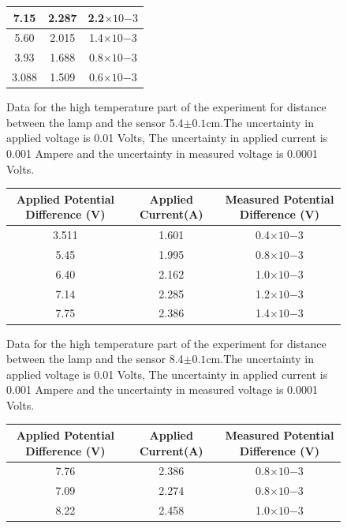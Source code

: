 \documentclass[10pt,a4paper]{article}
\begin{document}
{\begin{center}
\begin{figure} [H]
\begin{tabular}{|c |c|c|}
			\hline
			7.15 & 2.287 & 2.2$\times10{-3}$\\
			\hline
			5.60 & 2.015 & 1.4$\times10{-3}$\\
			\hline
			3.93 & 1.688 & 0.8$\times10{-3}$\\
			\hline
			3.088 & 1.509 & 0.6$\times10{-3}$\\
			\hline
		\end{tabular}
		\caption{Data for the high temperature part of the experiment for distance between the lamp and the sensor 5.4$\pm0.1$cm.The uncertainty in applied voltage is 0.01 Volts, The uncertainty in applied current is 0.001 Ampere and the uncertainty in measured voltage is 0.0001 Volts.}
	\end{figure}
\end{center}
\begin{center}
	\begin{figure} [H] 
		\begin{tabular}{|c |c|c|} \hline
			Applied Potential Difference (V)& Applied Current(A) & Measured Potential Difference (V)\\ [0.5ex] 
			\hline
			3.511 & 1.601 & 0.4$\times10{-3}$\\
			\hline
			5.45 & 1.995 & 0.8$\times10{-3}$\\
			\hline
			6.40 & 2.162 & 1.0$\times10{-3}$\\
			\hline
			7.14 & 2.285 & 1.2$\times10{-3}$\\
			\hline
			7.75 & 2.386 & 1.4$\times10{-3}$\\
			\hline
		\end{tabular}
		\caption{Data for the high temperature part of the experiment for distance between the lamp and the sensor 8.4$\pm0.1$cm.The uncertainty in applied voltage is 0.01 Volts, The uncertainty in applied current is 0.001 Ampere and the uncertainty in measured voltage is 0.0001 Volts.}
	\end{figure}
\end{center}
\begin{center}
	\begin{figure} [H] 
		\begin{tabular}{|c |c|c|} \hline
			Applied Potential Difference (V)& Applied Current(A) & Measured Potential Difference (V)\\ [0.5ex] 
			\hline
			7.76 & 2.386 & 0.8$\times10{-3}$\\
			\hline
			7.09 & 2.274 & 0.8$\times10{-3}$\\
			\hline
			8.22 & 2.458 & 1.0$\times10{-3}$\\

\end{tabular}
\end{figure}
\end{center}}
\end{document}
